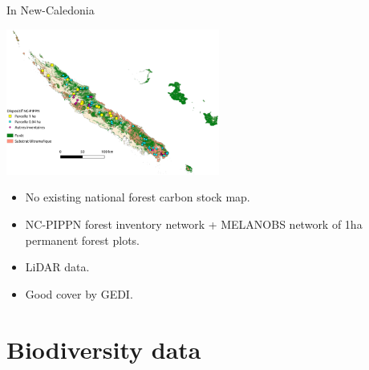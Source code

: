 \documentclass[10pt,table,dvipsnames,compress]{beamer}
\begin{document}
\begin{frame}[label={sec:orga5543c2}]{In New-Caledonia}
\begin{center}
\includegraphics[width=7cm]{figs/carbon/ncpippn-plots.png}
\end{center}

\begin{itemize}
\item No existing national forest carbon stock map.
\item NC-PIPPN forest inventory network + MELANOBS network of 1ha permanent forest plots.
\item LiDAR data.
\item Good cover by GEDI.
\end{itemize}
\end{frame}

\section{Biodiversity data}
\label{sec:org4a48a91}



\end{document}
